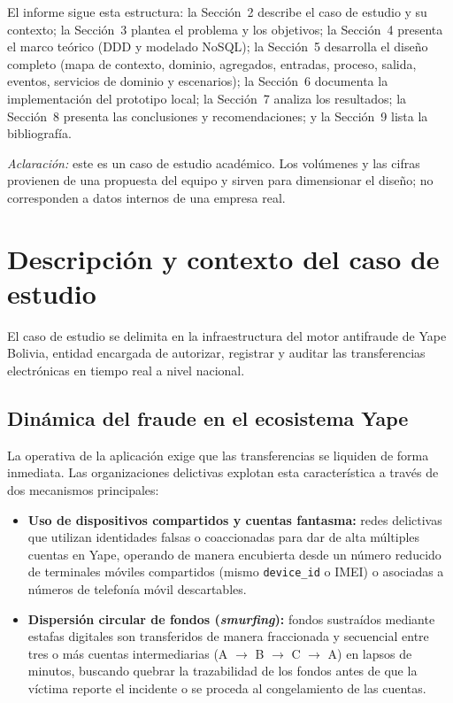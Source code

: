 \documentclass[11pt,a4paper]{article}
\begin{document}
	El informe sigue esta estructura: la Sección~2 describe el caso de estudio y su contexto; la Sección~3 plantea el problema y los objetivos; la Sección~4 presenta el marco teórico (DDD y modelado NoSQL); la Sección~5 desarrolla el diseño completo (mapa de contexto, dominio, agregados, entradas, proceso, salida, eventos, servicios de dominio y escenarios); la Sección~6 documenta la implementación del prototipo local; la Sección~7 analiza los resultados; la Sección~8 presenta las conclusiones y recomendaciones; y la Sección~9 lista la bibliografía.
	
	\textit{Aclaración:} este es un caso de estudio académico. Los volúmenes y las cifras provienen de una propuesta del equipo y sirven para dimensionar el diseño; no corresponden a datos internos de una empresa real.
	
	\section{Descripción y contexto del caso de estudio}
	El caso de estudio se delimita en la infraestructura del motor antifraude de Yape Bolivia, entidad encargada de autorizar, registrar y auditar las transferencias electrónicas en tiempo real a nivel nacional.
	
	\subsection{Dinámica del fraude en el ecosistema Yape}
	La operativa de la aplicación exige que las transferencias se liquiden de forma inmediata. Las organizaciones delictivas explotan esta característica a través de dos mecanismos principales:
	\begin{itemize}[leftmargin=2em]
		\item \textbf{Uso de dispositivos compartidos y cuentas fantasma:} redes delictivas que utilizan identidades falsas o coaccionadas para dar de alta múltiples cuentas en Yape, operando de manera encubierta desde un número reducido de terminales móviles compartidos (mismo \texttt{device\_id} o IMEI) o asociadas a números de telefonía móvil descartables.
		\item \textbf{Dispersión circular de fondos (\textit{smurfing}):} fondos sustraídos mediante estafas digitales son transferidos de manera fraccionada y secuencial entre tres o más cuentas intermediarias (A $\to$ B $\to$ C $\to$ A) en lapsos de minutos, buscando quebrar la trazabilidad de los fondos antes de que la víctima reporte el incidente o se proceda al congelamiento de las cuentas.
	\end{itemize}
	
\end{document}
